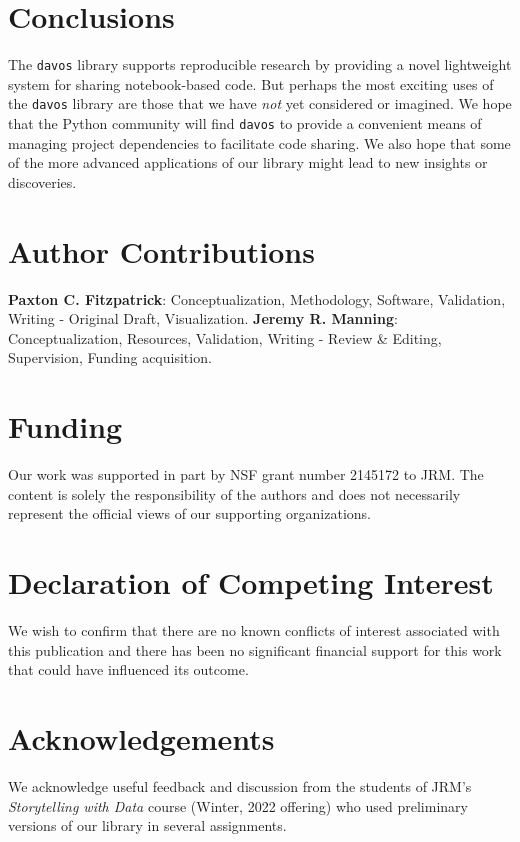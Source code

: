 \documentclass[preprint,12pt,a4paper]{elsarticle}
\begin{document}
\section{Conclusions}

The \texttt{davos} library supports reproducible research by providing
a novel lightweight system for sharing notebook-based code.  But
perhaps the most exciting uses of the \texttt{davos} library are those
that we have \textit{not} yet considered or imagined.  We hope that
the Python community will find \texttt{davos} to provide a convenient
means of managing project dependencies to facilitate code sharing.  We
also hope that some of the more advanced applications of our library
might lead to new insights or discoveries.


\section*{Author Contributions}
\textbf{Paxton C. Fitzpatrick}: Conceptualization, Methodology,
Software, Validation, Writing - Original Draft,
Visualization. \textbf{Jeremy R. Manning}: Conceptualization,
Resources, Validation, Writing - Review \& Editing, Supervision, Funding
acquisition.

\section*{Funding}
Our work was supported in part by NSF grant number 2145172 to JRM.
The content is solely the responsibility of the authors and does not necessarily represent the official views of our supporting organizations.


\section*{Declaration of Competing Interest}
We wish to confirm that there are no known conflicts of interest associated with this publication and there has been no significant financial support for this work that could have influenced its outcome.


\section*{Acknowledgements}
We acknowledge useful feedback and discussion from the students of
JRM's \textit{Storytelling with Data} course (Winter, 2022 offering)
who used preliminary versions of our library in several assignments.



\end{document}
